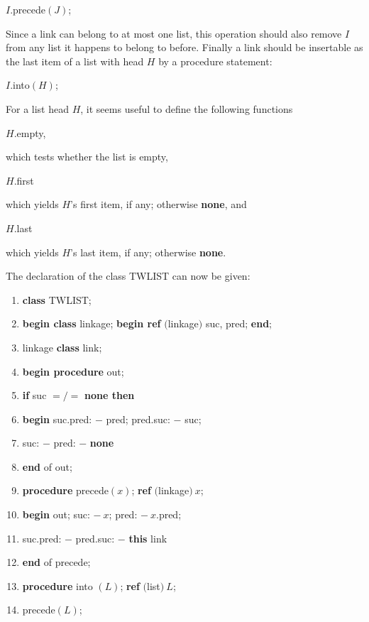 \documentclass[twoside,11pt]{book}
\begin{document}
\quad $I$.precede$(J)$;

\noindent
Since a link can belong to at most one list, this operation should also remove $I$ from any list it happens to belong to before. Finally a link should be insertable as the last item of a list with head $H$ by a procedure statement:

\quad $I$.into$(H)$;

For a list head $H$, it seems useful to define the following functions

\quad $H$.empty,

\noindent
which tests whether the list is empty,

\quad $H$.first

\noindent
which yields $H$'s first item, if any; otherwise \textbf{none}, and

\quad $H$.last

\noindent
which yields $H$'s last item, if any; otherwise \textbf{none}.

The declaration of the class TWLIST can now be given:

\begin{enumerate}[nosep, label=\arabic*.]
	\item \textbf{class} TWLIST;
	\item \textbf{begin class} linkage; \textbf{begin ref} $($linkage$)$ suc, pred; \textbf{end};
	\item \quad linkage \textbf{class} link;
	\item \quad \textbf{begin procedure} out;
	\item \quad \quad \textbf{if} suc $=/=$ \textbf{none then}
	\item \quad \quad \textbf{begin} suc.pred: $-$ pred; pred.suc: $-$ suc;
	\item \quad \quad \quad suc: $-$ pred: $-$ \textbf{none}
	\item \quad \quad \textbf{end} of out;
	\item \quad \quad \textbf{procedure} precede$(x)$; \textbf{ref} $($linkage$)\ x$;
	\item \quad \quad \textbf{begin} out; suc: $-\ x$; pred: $-\ x$.pred;
	\item \quad \quad \quad suc.pred: $-$ pred.suc: $-$ \textbf{this} link
	\item \quad \quad \textbf{end} of precede;
	\item \quad \quad \textbf{procedure} into $(L)$; \textbf{ref} $($list$)\ L$;
	\item \quad \quad \quad precede$(L)$;
\end{enumerate}
\end{document}
